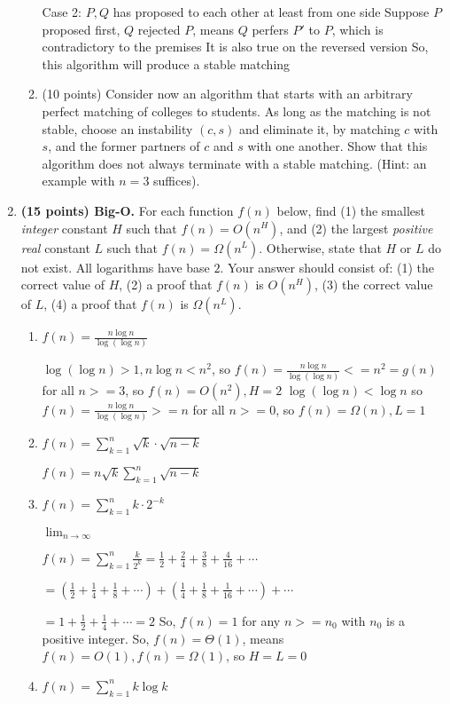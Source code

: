 \documentclass{article}
\newcommand{\thesoln}[1]{}
\newcommand{\thesoln}[1]{{\color{red}\textbf{Solution:} #1}}
\begin{document}
\begin{enumerate}[topsep=0pt]
\begin{enumerate}
Case 2: $P,Q$ has proposed to each other at least from one side
  Suppose $P$ proposed first,
  $Q$ rejected $P$, means $Q$ perfers $P'$ to $P$, which is contradictory to the premises
  It is also true on the reversed version
So, this algorithm will produce a stable matching


\item (10 points) Consider now an algorithm that starts with an arbitrary perfect matching of colleges to students. As long as the matching is not stable, choose an instability $(c, s)$ and eliminate it, by matching $c$ with $s$, and the former partners of $c$ and $s$ with one another. Show that this algorithm does not always terminate with a stable matching. (Hint: an example with $n = 3$ suffices).
\end{enumerate}   

\thesoln{
}
    
\item \textbf{(15 points) Big-O.} For each function $f(n)$ below, find (1) the smallest \emph{integer} constant $H$ such that $f(n) = O(n^H)$, and (2) the largest \emph{positive real} constant $L$ such that $f(n) = \Omega(n^L)$. Otherwise, state that $H$ or $L$ do not exist. All logarithms have base $2$. Your answer should consist of: (1) the correct value of $H$, (2) a proof that $f(n)$ is $O(n^H)$, (3) the correct value of $L$, (4) a proof that $f(n)$ is $\Omega(n^L)$.
  \begin{enumerate}
    \item $f(n) = \frac{n\log n}{\log(\log n)}$
    
    $\log(\log n)>1,n\log n<n^2$, so $f(n)=\frac{n\log n}{\log(\log n)}<=n^2=g(n)$ for all $n>=3$, so $f(n)=O(n^2),H=2$
    $\log(\log n)<\log n$ so $f(n)=\frac{n\log n}{\log(\log n)}>=n$ for all $n>=0$, so $f(n)=\Omega(n),L=1$
    \item $f(n) = \sum_{k=1}^n \sqrt{k}\cdot\sqrt{n-k}$
    
    $f(n)=n\sqrt{k}\sum_{k=1}^n\sqrt{n-k}$
    \item $f(n) = \sum_{k=1}^n k\cdot 2^{-k}$
    
    $\lim_{n\rightarrow\infty}$

    $f(n)=\sum_{k=1}^n\frac{k}{2^k}=\frac{1}{2}+\frac{2}{4}+\frac{3}{8}+\frac{4}{16}+\cdots$

    $=\left(\frac{1}{2}+\frac{1}{4}+\frac{1}{8}+\cdots\right)+\left(\frac{1}{4}+\frac{1}{8}+\frac{1}{16}+\cdots\right)+\cdots$

    $=1+\frac{1}{2}+\frac{1}{4}+\cdots=2$
    So, $f(n)=1$ for any $n>=n_0$ with $n_0$ is a positive integer.
    So, $f(n)=\Theta(1)$, means $f(n)=O(1),f(n)=\Omega(1)$, so $H=L=0$
    \item $f(n) = \sum_{k=1}^n k \log k$
    

\end{enumerate}
\end{enumerate}
\end{document}
